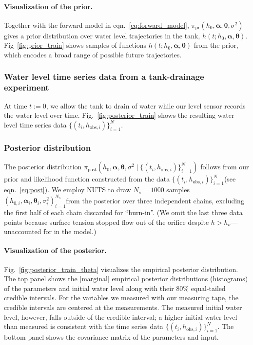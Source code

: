 \documentclass[openacc]{rsproca_new}%
\newcommand\thedata {$\{(t_i,h_{\text{obs}, i})\}_{i=1}^{N}$\xspace}
\newcommand\thedatanomath {\{(t_i,h_{\text{obs}, i})\}_{i=1}^{N}}
\newcommand\themodel {$h(t; h_0, \boldsymbol \alpha, \boldsymbol\theta)$\xspace}
\newcommand\thesamples{$(h_{0, i}, \boldsymbol \alpha_i, \boldsymbol \theta_i, \sigma_i^2)_{i=1}^{N_s}$}
\begin{document}
\paragraph{Visualization of the prior.}
Together with the forward model in eqn.~\ref{eq:forward_model}, $\pi_{\text{pr}}(h_0, \boldsymbol \alpha, \boldsymbol \theta, \sigma^2)$ gives a prior distribution over water level trajectories in the tank, \themodel. 
Fig~\ref{fig:prior_train} shows samples of functions \themodel from the prior, which encodes a broad range of possible future trajectories. 

\subsubsection{Water level time series data from a tank-drainage experiment} At time $t:=0$, we allow the tank to drain of water while our level sensor records the water level over time. 
Fig.~\ref{fig:posterior_train} shows the resulting water level time series data \thedata.

\subsubsection{Posterior distribution}
The posterior distribution $\pi_{\text{post}}(h_0, \boldsymbol \alpha, \boldsymbol \theta, \sigma^2 \mid \thedatanomath)$ follows from our prior and likelihood function constructed from the data \thedata (see eqn.~\ref{eq:post}). 
We employ NUTS to draw $N_s=1000$ samples \thesamples from the posterior over three independent chains, excluding the first half of each chain discarded for ``burn-in''. 
(We omit the last three data points because surface tension stopped flow out of the orifice despite $h>h_o$---unaccounted for in the model.)


\paragraph{Visualization of the posterior.}Fig.~\ref{fig:posterior_train_theta} visualizes the empirical posterior distribution. 
The top panel shows the [marginal] empirical posterior distributions (histograms) of the parameters and initial water level along with their 80\% equal-tailed credible intervals. 
For the variables we measured with our measuring tape, the credible intervals are centered at the measurements. 
The measured initial water level, however, falls outside of the credible interval; a higher initial water level than measured is consistent with the time series data \thedata.
The bottom panel shows the covariance matrix of the parameters and input. 
\end{document}
